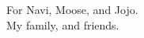 \vspace*{\fill}
\begin{center}
  For Navi, Moose, and Jojo.\\
  My family, and friends.
\end{center}
\vspace*{\fill}
\clearpage
